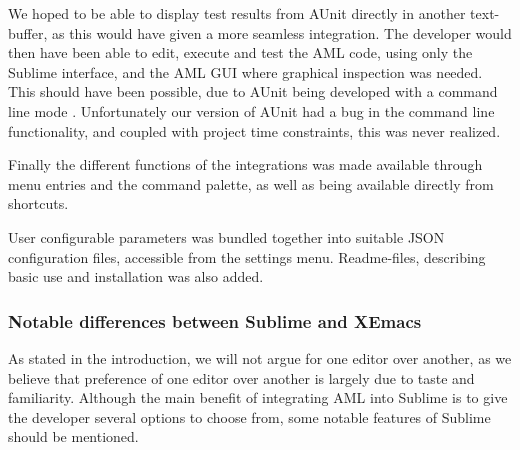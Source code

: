 We hoped to be able to display test results from AUnit directly in another text-buffer, as this would have given a more seamless integration. The developer would then have been able to edit, execute and test the AML code, using only the Sublime interface, and the AML GUI where graphical inspection was needed. This should have been possible, due to AUnit being developed with a command line mode \cite{aunit}. Unfortunately our version of AUnit had a bug in the command line functionality, and coupled with project time constraints, this was never realized.

Finally the different functions of the integrations was made available through menu entries and the command palette, as well as being available directly from shortcuts.

User configurable parameters was bundled together into suitable JSON configuration files, accessible from the settings menu. Readme-files, describing basic use and installation was also added.

\subsubsection{Notable differences between Sublime and XEmacs} %
\label{ssub:notable_differences_between_sublime_and_xemacs}
As stated in the introduction, we will not argue for one editor over another, as we believe that preference of one editor over another is largely due to taste and familiarity. Although the main benefit of integrating AML into Sublime is to give the developer several options to choose from, some notable features of Sublime should be mentioned.

